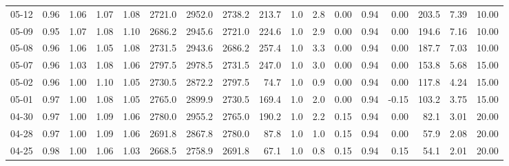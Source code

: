 \begin{threeparttable}
{\begin{tabular}{lrrrrrrrrrrrrrrrr}
  05-12 &         0.96 &           1.06 &          1.07 &          1.08 & 2721.0 & 2952.0 & 2738.2 &      213.7 &                      1.0 &                 2.8 &       0.00 &      0.94 &           0.00 &            203.5 &            7.39 &                  10.00 \\
  05-09 &         0.95 &           1.07 &          1.08 &          1.10 & 2686.2 & 2945.6 & 2721.0 &      224.6 &                      1.0 &                 2.9 &       0.00 &      0.94 &           0.00 &            194.6 &            7.16 &                  10.00 \\
  05-08 &         0.96 &           1.06 &          1.05 &          1.08 & 2731.5 & 2943.6 & 2686.2 &      257.4 &                      1.0 &                 3.3 &       0.00 &      0.94 &           0.00 &            187.7 &            7.03 &                  10.00 \\
  05-07 &         0.96 &           1.03 &          1.08 &          1.06 & 2797.5 & 2978.5 & 2731.5 &      247.0 &                      1.0 &                 3.0 &       0.00 &      0.94 &           0.00 &            153.8 &            5.68 &                  15.00 \\
  05-02 &         0.96 &           1.00 &          1.10 &          1.05 & 2730.5 & 2872.2 & 2797.5 &       74.7 &                      1.0 &                 0.9 &       0.00 &      0.94 &           0.00 &            117.8 &            4.24 &                  15.00 \\
  05-01 &         0.97 &           1.00 &          1.08 &          1.05 & 2765.0 & 2899.9 & 2730.5 &      169.4 &                      1.0 &                 2.0 &       0.00 &      0.94 &          -0.15 &            103.2 &            3.75 &                  15.00 \\
  04-30 &         0.97 &           1.00 &          1.09 &          1.06 & 2780.0 & 2955.2 & 2765.0 &      190.2 &                      1.0 &                 2.2 &       0.15 &      0.94 &           0.00 &             82.1 &            3.01 &                  20.00 \\
  04-28 &         0.97 &           1.00 &          1.09 &          1.06 & 2691.8 & 2867.8 & 2780.0 &       87.8 &                      1.0 &                 1.0 &       0.15 &      0.94 &           0.00 &             57.9 &            2.08 &                  20.00 \\
  04-25 &         0.98 &           1.00 &          1.06 &          1.03 & 2668.5 & 2758.9 & 2691.8 &       67.1 &                      1.0 &                 0.8 &       0.15 &      0.94 &           0.15 &             54.1 &            2.01 &                  20.00 \\

\end{tabular}}
\end{threeparttable}
